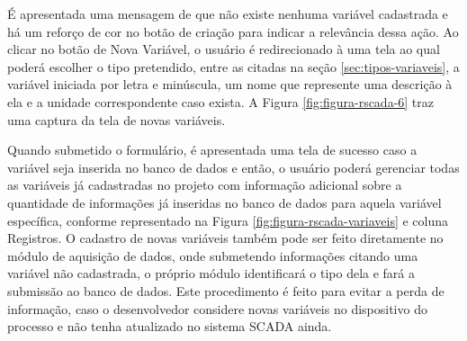     	\begin{figure}[!h]
    	\end{figure}

É apresentada uma mensagem de que não existe nenhuma variável cadastrada e há um reforço de cor no botão de criação para indicar a relevância dessa ação. Ao clicar no botão de Nova Variável, o usuário é redirecionado à uma tela ao qual poderá escolher o tipo pretendido, entre as citadas na seção \ref{sec:tipos-variaveis}, a variável iniciada por letra e minúscula, um nome que represente uma descrição à ela e a unidade correspondente caso exista. A Figura \ref{fig:figura-rscada-6} traz uma captura da tela de novas variáveis.

        \begin{figure}[!h]
    	\end{figure}
    	
Quando submetido o formulário, é apresentada uma tela de sucesso caso a variável seja inserida no banco de dados e então, o usuário poderá gerenciar todas as variáveis já cadastradas no projeto com informação adicional sobre a quantidade de informações já inseridas no banco de dados para aquela variável específica, conforme representado na Figura \ref{fig:figura-rscada-variaveis} e coluna Registros. O cadastro de novas variáveis também pode ser feito diretamente no módulo de aquisição de dados, onde submetendo informações citando uma variável não cadastrada, o próprio módulo identificará o tipo dela e fará a submissão ao banco de dados. Este procedimento é feito para evitar a perda de informação, caso o desenvolvedor considere novas variáveis no dispositivo do processo e não tenha atualizado no sistema \gls{SCADA} ainda.

